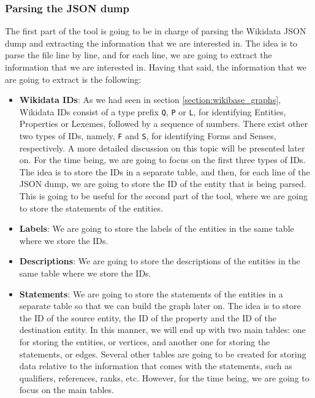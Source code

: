 \label{section:json_dump}
\subsubsection{Parsing the JSON dump}

The first part of the tool is going to be in charge of parsing the Wikidata JSON dump and extracting the information that we are interested in. The idea is to parse the file line by line, and for each line, we are going to extract the information that we are interested in. Having that said, the information that we are going to extract is the following:

\begin{itemize}
    \itemsep0.5em
    \item \textbf{Wikidata IDs}: As we had seen in section \ref{section:wikibase_graphs}, Wikidata IDs consist of a type prefix \texttt{Q}, \texttt{P} or \texttt{L}, for identifying Entities, Properties or Lexemes, followed by a sequence of numbers. There exist other two types of IDs, namely, \texttt{F} and \texttt{S}, for identifying Forms and Senses, respectively. A more detailed discussion on this topic will be presented later on. For the time being, we are going to focus on the first three types of IDs. The idea is to store the IDs in a separate table, and then, for each line of the JSON dump, we are going to store the ID of the entity that is being parsed. This is going to be useful for the second part of the tool, where we are going to store the statements of the entities.
    \item \textbf{Labels}: We are going to store the labels of the entities in the same table where we store the IDs.
    \item \textbf{Descriptions}: We are going to store the descriptions of the entities in the same table where we store the IDs.
    \item \textbf{Statements}: We are going to store the statements of the entities in a separate table so that we can build the graph later on. The idea is to store the ID of the source entity, the ID of the property and the ID of the destination entity. In this manner, we will end up with two main tables: one for storing the entities, or vertices, and another one for storing the statements, or edges. Several other tables are going to be created for storing data relative to the information that comes with the statements, such as qualifiers, references, ranks, etc. However, for the time being, we are going to focus on the main tables.
\end{itemize}

